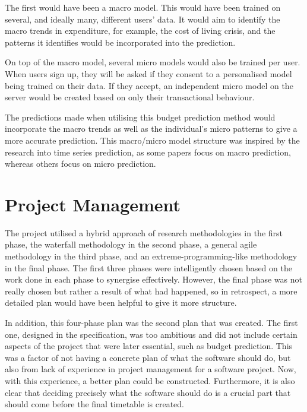 The first would have been a macro model. This would have been trained on several, and ideally many, different users' data. It would aim to identify the macro trends in expenditure, for example, the cost of living crisis, and the patterns it identifies would be incorporated into the prediction.

On top of the macro model, several micro models would also be trained per user. When users sign up, they will be asked if they consent to a personalised model being trained on their data. If they accept, an independent micro model on the server would be created based on only their transactional behaviour.

The predictions made when utilising this budget prediction method would incorporate the macro trends as well as the individual's micro patterns to give a more accurate prediction. This macro/micro model structure was inspired by the research into time series prediction, as some papers focus on macro prediction, whereas others focus on micro prediction.

\section{Project Management}
The project utilised a hybrid approach of research methodologies in the first phase, the waterfall methodology in the second phase, a general agile methodology in the third phase, and an extreme-programming-like methodology in the final phase. The first three phases were intelligently chosen based on the work done in each phase to synergise effectively. However, the final phase was not really chosen but rather a result of what had happened, so in retrospect, a more detailed plan would have been helpful to give it more structure.

In addition, this four-phase plan was the second plan that was created. The first one, designed in the specification, was too ambitious and did not include certain aspects of the project that were later essential, such as budget prediction. This was a factor of not having a concrete plan of what the software should do, but also from lack of experience in project management for a software project. Now, with this experience, a better plan could be constructed. Furthermore, it is also clear that deciding precisely what the software should do is a crucial part that should come before the final timetable is created.